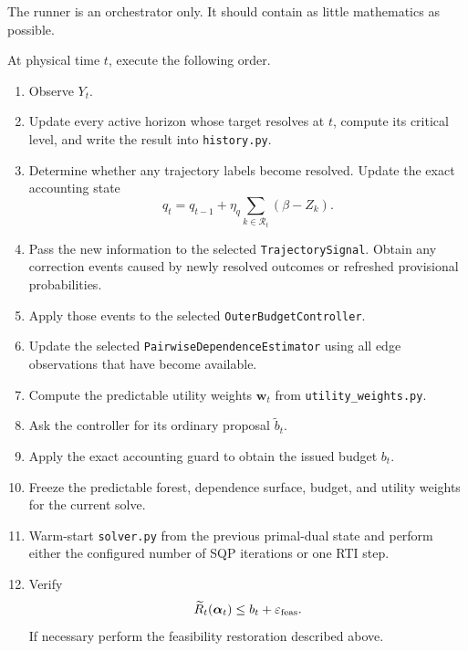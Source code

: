 \documentclass[11pt]{article}
\begin{document}
The runner is an orchestrator only.  It should contain as little mathematics
as possible.

At physical time $t$, execute the following order.

\begin{enumerate}[leftmargin=*]
    \item Observe $Y_t$.

    \item Update every active horizon whose target resolves at $t$, compute
    its critical level, and write the result into \texttt{history.py}.

    \item Determine whether any trajectory labels become resolved.  Update
    the exact accounting state
    \[
        q_t
        =
        q_{t-1}
        +
        \eta_q
        \sum_{k\in\mathcal R_t}
        (\beta-Z_k).
    \]

    \item Pass the new information to the selected
    \texttt{TrajectorySignal}.  Obtain any correction events caused by
    newly resolved outcomes or refreshed provisional probabilities.

    \item Apply those events to the selected
    \texttt{OuterBudgetController}.

    \item Update the selected
    \texttt{PairwiseDependenceEstimator} using all edge observations that
    have become available.

    \item Compute the predictable utility weights $\bm w_t$ from
    \texttt{utility\_weights.py}.

    \item Ask the controller for its ordinary proposal
    $\widetilde b_t$.

    \item Apply the exact accounting guard to obtain the issued budget $b_t$.

    \item Freeze the predictable forest, dependence surface, budget, and
    utility weights for the current solve.

    \item Warm-start \texttt{solver.py} from the previous primal-dual state
    and perform either the configured number of SQP iterations or one RTI
    step.

    \item Verify
    \[
        \widetilde R_t(\bm\alpha_t)
        \le b_t+\varepsilon_{\rm feas}.
    \]
    If necessary perform the feasibility restoration described above.


\end{enumerate}
\end{document}
